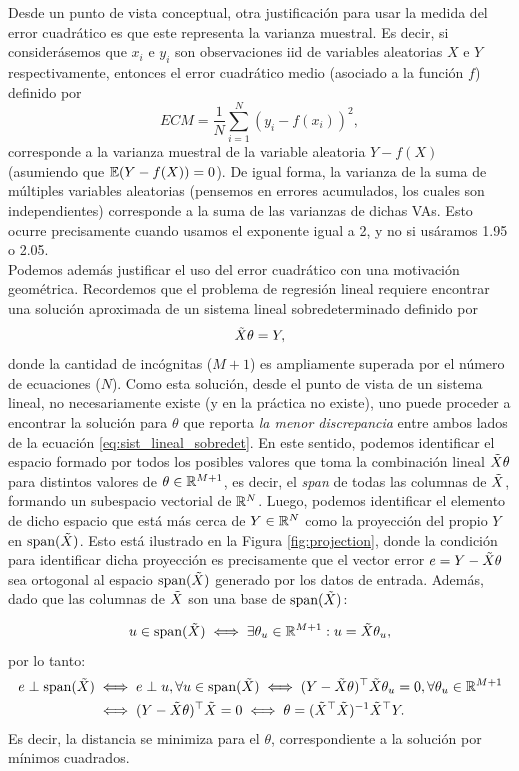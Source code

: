Desde un punto de vista conceptual, otra justificación para usar la medida del  error cuadrático es que este representa la varianza muestral. Es decir, si considerásemos que $x_i$ e $y_i$ son observaciones iid de variables aleatorias $X$ e $Y$ respectivamente, entonces el error cuadrático medio (asociado a la función $f$) definido por
\begin{equation}
	ECM = \frac{1}{N}\sum_{i=1}^N (y_i-f(x_i))^2,
\end{equation}
corresponde a la varianza muestral de la variable aleatoria $Y-f(X)$ (asumiendo que $\operatorname{\mathbb{E}}(Y-f(X))=0$). De igual forma, la varianza de la suma de múltiples variables aleatorias (pensemos en errores acumulados, los cuales son independientes) corresponde a la suma de las varianzas de dichas VAs. Esto ocurre precisamente cuando usamos el exponente igual a 2, y no si usáramos 1.95 o 2.05.\\

Podemos además justificar el uso del error cuadrático con una motivación geométrica. Recordemos que el problema de regresión lineal requiere encontrar una solución aproximada de un sistema lineal sobredeterminado definido por 
\begin{equation}
	\tilde{X} \theta = Y,\label{eq:sist_lineal_sobredet}
\end{equation}
donde la cantidad de incógnitas ($M+1$) es ampliamente superada por el número de ecuaciones ($N$). Como esta solución, desde el punto de vista de un sistema lineal, no necesariamente existe (y en la práctica no existe), uno puede proceder a encontrar la solución para $\theta$ que reporta \emph{la menor discrepancia} entre ambos lados de la ecuación \eqref{eq:sist_lineal_sobredet}. En este sentido, podemos identificar el espacio formado por todos los posibles valores que toma la combinación lineal $\tilde{X} \theta$ para distintos valores de $\theta\in\mathbb{R}^{M+1}$, es decir, el \emph{span} de todas las columnas de $\tilde{X}$, formando un subespacio vectorial de $\mathbb{R}^N$. Luego, podemos identificar el elemento de dicho espacio que está más cerca de $Y\in\mathbb{R}^N$  como la proyección del propio $Y$ en $\text{span}(\tilde{X})$. Esto está ilustrado en la Figura \ref{fig:projection}, donde la condición para identificar dicha proyección es  precisamente que el vector error $e=Y-\tilde{X} \theta$ sea ortogonal al espacio  $\text{span}(\tilde{X})$ generado por los datos de entrada. Además, dado que las columnas de $\tilde{X}$ son una base de $\text{span}(\tilde{X})$:

\begin{equation}
	u\in \text{span}(\tilde{X}) \iff \exists \theta_u\in \mathbb{R}^{M+1}: u=\tilde{X}\theta_u,
\end{equation}
por lo tanto:
\begin{align}
	 e\perp \text{span}(\tilde{X}) &\iff e\perp u,\forall u \in \text{span}(\tilde{X}) \iff (Y-\tilde{X} \theta)^\top \tilde{X} \theta_u = 0, \forall \theta_u \in \mathbb{R}^{M+1} \nonumber\\
	& \iff (Y-\tilde{X} \theta)^\top \tilde{X}=0 \iff  \theta = (\tilde{X}^\top\tilde{X})^{-1}\tilde{X}^\top Y.
\end{align}
Es decir, la distancia se minimiza para el $\theta$, correspondiente a la solución por mínimos cuadrados.\\


